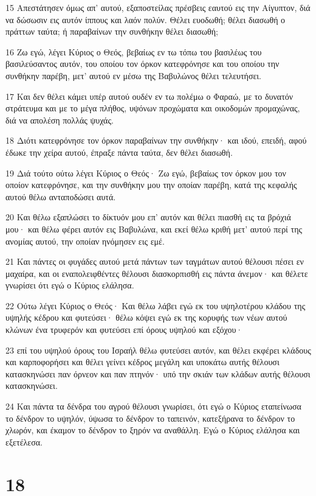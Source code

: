 \par 15 Απεστάτησεν όμως απ' αυτού, εξαποστείλας πρέσβεις εαυτού εις την Αίγυπτον, διά να δώσωσιν εις αυτόν ίππους και λαόν πολύν. Θέλει ευοδωθή; θέλει διασωθή ο πράττων ταύτα; ή παραβαίνων την συνθήκην θέλει διασωθή;
\par 16 Ζω εγώ, λέγει Κύριος ο Θεός, βεβαίως εν τω τόπω του βασιλέως του βασιλεύσαντος αυτόν, του οποίου τον όρκον κατεφρόνησε και του οποίου την συνθήκην παρέβη, μετ' αυτού εν μέσω της Βαβυλώνος θέλει τελευτήσει.
\par 17 Και δεν θέλει κάμει υπέρ αυτού ουδέν εν τω πολέμω ο Φαραώ, με το δυνατόν στράτευμα και με το μέγα πλήθος, υψόνων προχώματα και οικοδομών προμαχώνας, διά να απολέση πολλάς ψυχάς.
\par 18 Διότι κατεφρόνησε τον όρκον παραβαίνων την συνθήκην· και ιδού, επειδή, αφού έδωκε την χείρα αυτού, έπραξε πάντα ταύτα, δεν θέλει διασωθή.
\par 19 Διά τούτο ούτω λέγει Κύριος ο Θεός· Ζω εγώ, βεβαίως τον όρκον μου τον οποίον κατεφρόνησε, και την συνθήκην μου την οποίαν παρέβη, κατά της κεφαλής αυτού θέλω ανταποδώσει αυτά.
\par 20 Και θέλω εξαπλώσει το δίκτυόν μου επ' αυτόν και θέλει πιασθή εις τα βρόχιά μου· και θέλω φέρει αυτόν εις Βαβυλώνα, και εκεί θέλω κριθή μετ' αυτού περί της ανομίας αυτού, την οποίαν ηνόμησεν εις εμέ.
\par 21 Και πάντες οι φυγάδες αυτού μετά πάντων των ταγμάτων αυτού θέλουσι πέσει εν μαχαίρα, και οι εναπολειφθέντες θέλουσι διασκορπισθή εις πάντα άνεμον· και θέλετε γνωρίσει ότι εγώ ο Κύριος ελάλησα.
\par 22 Ούτω λέγει Κύριος ο Θεός· Και θέλω λάβει εγώ εκ του υψηλοτέρου κλάδου της υψηλής κέδρου και φυτεύσει· θέλω κόψει εγώ εκ της κορυφής των νέων αυτού κλώνων ένα τρυφερόν και φυτεύσει επί όρους υψηλού και εξόχου·
\par 23 επί του υψηλού όρους του Ισραήλ θέλω φυτεύσει αυτόν, και θέλει εκφέρει κλάδους και καρποφορήσει και θέλει γείνει κέδρος μεγάλη και υποκάτω αυτής θέλουσι κατασκηνώσει παν όρνεον και παν πτηνόν· υπό την σκιάν των κλάδων αυτής θέλουσι κατασκηνώσει.
\par 24 Και πάντα τα δένδρα του αγρού θέλουσι γνωρίσει, ότι εγώ ο Κύριος εταπείνωσα το δένδρον το υψηλόν, ύψωσα το δένδρον το ταπεινόν, κατεξήρανα το δένδρον το χλωρόν, και έκαμον το δένδρον το ξηρόν να αναθάλλη. Εγώ ο Κύριος ελάλησα και εξετέλεσα.

\chapter{18}

